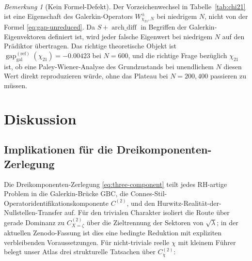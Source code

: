 \documentclass[a4paper,10pt,twocolumn]{article}
\theoremstyle{definition}
\theoremstyle{remark}
\newtheorem{remark}[theorem]{Bemerkung}
\newcommand{\gap}{\operatorname{gap}}
\newcommand{\chifn}{\chi}
\newcommand{\archdiff}{\operatorname{arch\_diff}}
\begin{document}
\begin{remark}[Kein Formel-Defekt]
\label{rem:chi21-not-defect}
Der Vorzeichenwechsel in Tabelle~\ref{tab:chi21} ist eine Eigenschaft des
Galerkin-Operators $W^\pm_{\chifn_{21},N}$ bei niedrigem $N$, nicht von der
Formel \eqref{eq:gap-unreduced}. Da $S+\archdiff$ in
Begriffen der Galerkin-Eigenvektoren definiert ist, wird jeder
falsche Eigenwert bei niedrigem $N$ auf den Prädiktor übertragen. Das richtige theoretische
Objekt ist $\gap_{\mathrm{gal}}^{(\mathrm{ref})}(\chifn_{21})=-0.00423$ bei $N=600$,
und die richtige Frage bezüglich $\chifn_{21}$ ist, ob eine
Paley-Wiener-Analyse des Grundzustands bei unendlichem $N$ diesen Wert direkt reproduzieren würde,
ohne das Plateau bei $N=200,400$ passieren zu müssen.
\end{remark}

\section{Diskussion}
\label{sec:discussion}

\subsection{Implikationen für die Dreikomponenten-Zerlegung}
\label{sec:discussion-three-component}

Die Dreikomponenten-Zerlegung \eqref{eq:three-component} teilt
jedes RH-artige Problem in die Galerkin-Brücke $\mathrm{GBC}$, die
Connes-Stil-Operatoridentifikationskomponente $C^{(2)}$, und den
Hurwitz-Realität-der-Nullstellen-Transfer auf. Für den trivialen Charakter
isoliert \cite{RH_II} die Route über gerade Dominanz zu
$C^{(2)}_{X=\zeta}$ über die Zieltrennung der Sektoren von
$\sqrt{\lambda}$; in der aktuellen Zenodo-Fassung ist dies eine bedingte
Reduktion mit expliziten verbleibenden Voraussetzungen. Für nicht-triviale
reelle $\chifn$ mit kleinem Führer belegt unser Atlas drei strukturelle
Tatsachen über $C^{(2)}_{\chifn}$:
\end{document}
